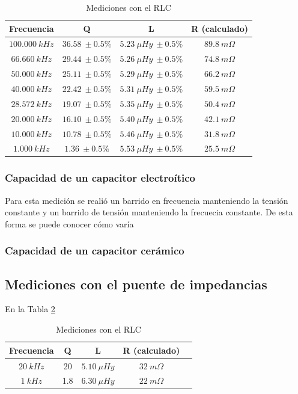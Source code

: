 \documentclass[a4paper,10pt]{article}
\begin{document}
		\begin{table}[!htp]
			\centering
			\begin{tabular}{|c|c|c|c|}
				\hline
				Frecuencia & Q & L  & R (calculado) \\
				\hline
				$100.000~kHz$& $36.58~\pm0.5\%$ & $5.23~\mu Hy~\pm0.5\%$ &$ 89.8~m\Omega$ \\
				\hline
				$66.660~kHz$& $29.44~\pm0.5\%$ & $5.26~\mu Hy~\pm0.5\%$ &$ 74.8~m\Omega$ \\
				\hline
				$50.000~kHz$& $25.11~\pm0.5\%$ & $5.29~\mu Hy~\pm0.5\%$ &$ 66.2~m\Omega$ \\
				\hline  
				$40.000~kHz$& $22.42~\pm0.5\%$ & $5.31~\mu Hy~\pm0.5\%$ &$ 59.5~m\Omega$ \\
				\hline  										
				$28.572~kHz$& $19.07~\pm0.5\%$ & $5.35~\mu Hy~\pm0.5\%$ &$ 50.4~m\Omega$ \\
				\hline
				$20.000~kHz$& $16.10~\pm0.5\%$ & $5.40~\mu Hy~\pm0.5\%$ &$ 42.1~m\Omega$ \\
				\hline  
				$10.000~kHz$& $10.78~\pm0.5\%$ & $5.46~\mu Hy~\pm0.5\%$ &$ 31.8~m\Omega$ \\
				\hline 										
				$1.000~kHz$& $1.36~\pm0.5\%$ & $5.53~\mu Hy~\pm0.5\%$ &$ 25.5~m\Omega$ \\
				\hline 	  
			\end{tabular}
			\caption{Mediciones con el RLC} \label{tabRLCbobina}
		\end{table}
				
		\subsubsection{Capacidad de un capacitor electro\'itico}	
		\indent Para esta medición se realió un barrido en frecuencia 
		manteniendo la tensión constante y un barrido de tensión manteniendo la
		frecuecia constante. De esta forma se puede conocer cómo varía 
		
		\subsubsection{Capacidad de un capacitor cer\'amico}
		
		\subsection{Mediciones con el puente de impedancias}
		En la Tabla \ref{tabPUENTEbobina}
		\begin{table}[!htp]
					\centering
					\begin{tabular}{|c|c|c|c|c|}
						\hline
			    		Frecuencia & Q & L  & R (calculado) \\
						\hline
						$20~kHz$& 20 & $5.10~\mu Hy$ &$ 32~m\Omega$ \\
						\hline
						$1~kHz$& 1.8 & $6.30~\mu Hy$ &$ 22~m\Omega$ \\
						\hline	  
					\end{tabular}
					\caption{Mediciones con el RLC} \label{tabPUENTEbobina}
				\end{table}	
\end{document}
